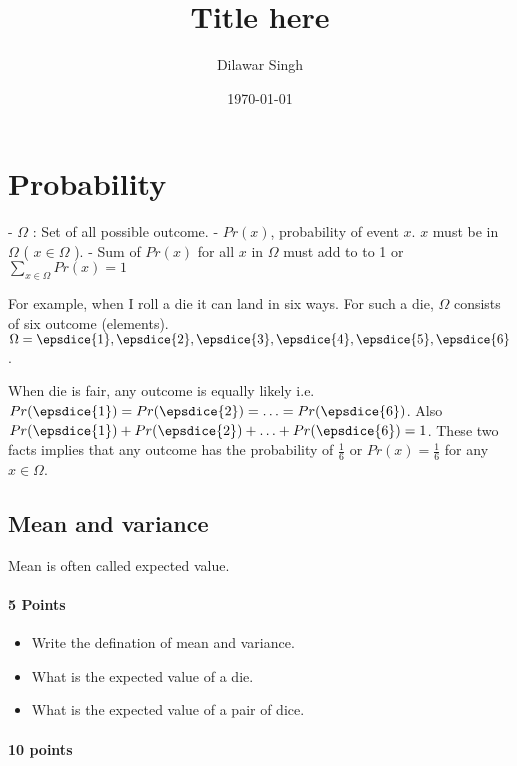 \documentclass[a4paper,10pt]{article}
\title{Title here}
\author{Dilawar Singh}
\date{\today}
\begin{document}
\maketitle
\begin{abstract}

\end{abstract}

\section{Probability}

- $\Omega$ : Set of all possible outcome.
- $Pr(x)$, probability of event $x$. $x$ must be in $\Omega$ ( $x \in \Omega$ ).
- Sum of $Pr(x)$ for all $x$ in $\Omega$ must add to to 1 or $\sum_{x\in\Omega} Pr(x)= 1$

For example, when I roll a die it can land in six ways. For such a  die,
$\Omega$ consists of six outcome (elements).  $\Omega={ \epsdice{1},
\epsdice{2}, \epsdice{3},\epsdice{4},\epsdice{5},\epsdice{6} }$. 

When die is fair, any outcome is equally likely i.e. $Pr(\epsdice{1}) =
Pr(\epsdice{2}) = \ldots = Pr(\epsdice{6})$. Also $Pr(\epsdice{1}) +
Pr(\epsdice{2}) + \ldots + Pr(\epsdice{6}) = 1$. These two facts implies that
any outcome has the probability of $\frac{1}{6}$ or $Pr(x) = \frac{1}{6}$ for
any $x\in\Omega$.

\subsection{Mean and variance}

Mean is often called expected value.

\paragraph{5 Points}

\begin{itemize}
    \item Write the defination of mean and variance.
    \item What is the expected value of a die. 
    \item What is the expected value of a pair of dice.
\end{itemize}

\paragraph{10 points}
\end{document}
